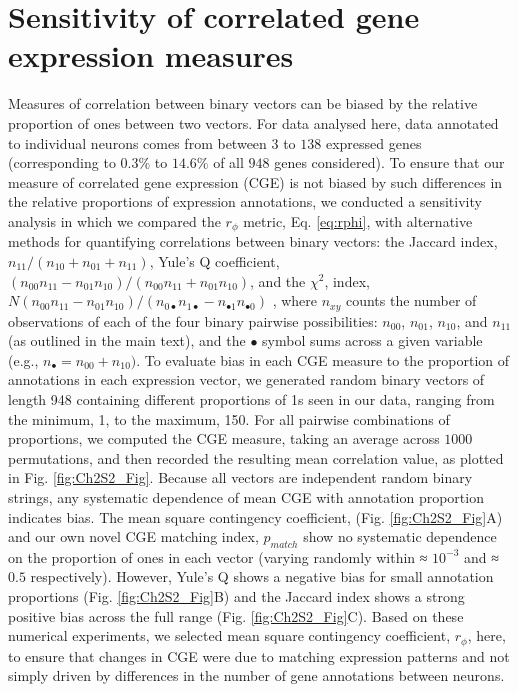 \section{Sensitivity of correlated gene expression measures}
\label{app:AppendixCh2_2}
Measures of correlation between binary vectors can be biased by the relative proportion of ones
between two vectors. For data analysed here, data annotated to individual neurons comes from between $3$ to
$138$ expressed genes (corresponding to $0.3\%$ to $14.6\%$ of all $948$ genes considered). To ensure that our measure of correlated gene expression (CGE) is not biased by such differences in the relative proportions of expression annotations, we conducted a sensitivity analysis in which we compared the $r_\phi$ metric, Eq. \ref{eq:rphi}, with alternative
methods for quantifying correlations between binary vectors: the Jaccard index, $n_{11}/(n_{10}+n_{01}+n_{11})$, Yule's Q
coefficient, $(n_{00}n_{11}-n_{01}n_{10})/(n_{00}n_{11}+n_{01}n_{10})$, and the $\chi{^2}$, index, $N(n_{00}n_{11}-n_{01}n_{10})/(n_{0\bullet}n_{1\bullet}-n_{\bullet1}n_{\bullet0})$ \citep{Kaufman2006}, where $n_{xy}$ counts
the number of observations of each of the four binary pairwise possibilities: $n_{00}$, $n_{01}$, $n_{10}$, and $n_{11}$ (as outlined in
the main text), and the $\bullet$ symbol sums across a given variable (e.g., $n_{\bullet}= n_{00} + n_{10})$.
To evaluate bias in each CGE measure to the proportion of annotations in each expression vector, we
generated random binary vectors of length 948 containing different proportions of 1s seen in our data, ranging
from the minimum, 1, to the maximum, 150. For all pairwise combinations of proportions, we computed the CGE
measure, taking an average across $1 000$ permutations, and then recorded the resulting mean correlation value,
as plotted in Fig. \ref{fig:Ch2S2_Fig}. Because all vectors are independent random binary strings, any systematic dependence of
mean CGE with annotation proportion indicates bias. The mean square contingency coefficient, (Fig. \ref{fig:Ch2S2_Fig}A) and
our own novel CGE matching index, $p_{match}$ show no systematic dependence on the proportion of ones in
each vector (varying randomly within ≈ $10^{-3}$ and ≈ $0.5$ respectively). However, Yule's Q shows a negative bias for
small annotation proportions (Fig. \ref{fig:Ch2S2_Fig}B) and the Jaccard index shows a strong positive bias across the full range (Fig. \ref{fig:Ch2S2_Fig}C). Based on these numerical experiments, we selected mean square contingency coefficient, $r_\phi$, here, to
ensure that changes in CGE were due to matching expression patterns and not simply driven by differences in the
number of gene annotations between neurons.


